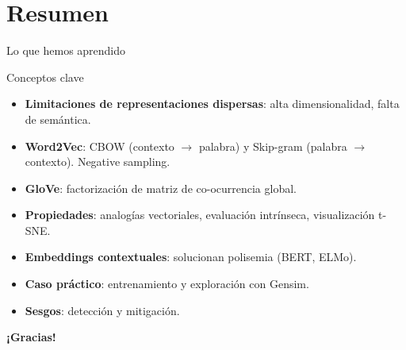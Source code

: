 \documentclass[aspectratio=169, 10pt, xcolor=table]{beamer}
\begin{document}
\section{Resumen}

\begin{frame}{Lo que hemos aprendido}
    \begin{exampleblock}{Conceptos clave}
        \begin{itemize}
            \item \textbf{Limitaciones de representaciones dispersas}: alta dimensionalidad, falta de semántica.
            \item \textbf{Word2Vec}: CBOW (contexto $\rightarrow$ palabra) y Skip-gram (palabra $\rightarrow$ contexto). Negative sampling.
            \item \textbf{GloVe}: factorización de matriz de co-ocurrencia global.
            \item \textbf{Propiedades}: analogías vectoriales, evaluación intrínseca, visualización t-SNE.
            \item \textbf{Embeddings contextuales}: solucionan polisemia (BERT, ELMo).
            \item \textbf{Caso práctico}: entrenamiento y exploración con Gensim.
            \item \textbf{Sesgos}: detección y mitigación.
        \end{itemize}
    \end{exampleblock}
\end{frame}

\begin{frame}
    \centering
    \Huge \textbf{¡Gracias!}

\end{frame}
\end{document}
